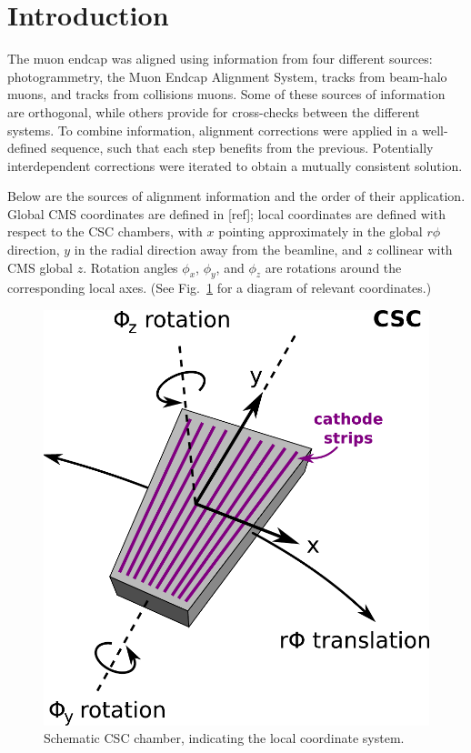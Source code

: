 \documentclass[12pt]{article}
\begin{document}
\section{Introduction}

The muon endcap was aligned using information from four different
sources: photogrammetry, the Muon Endcap Alignment System, tracks from
beam-halo muons, and tracks from collisions muons.  Some of these
sources of information are orthogonal, while others provide for
cross-checks between the different systems.  To combine information,
alignment corrections were applied in a well-defined sequence, such
that each step benefits from the previous.  Potentially interdependent
corrections were iterated to obtain a mutually consistent solution.

Below are the sources of alignment information and the order of their
application.  Global CMS coordinates are defined in [ref]; local
coordinates are defined with respect to the CSC chambers, with $x$
pointing approximately in the global $r\phi$ direction, $y$ in the
radial direction away from the beamline, and $z$ collinear with CMS
global $z$.  Rotation angles $\phi_x$, $\phi_y$, and $\phi_z$ are
rotations around the corresponding local axes.  (See
Fig.~\ref{fig:csc_coordinates} for a diagram of relevant coordinates.)

\begin{figure}
\begin{center}
\includegraphics[width=0.3\linewidth]{csc_coordinates.pdf}

\caption{Schematic CSC chamber, indicating the local coordinate
  system. \label{fig:csc_coordinates}}
\end{center}

\end{figure}
\end{document}
